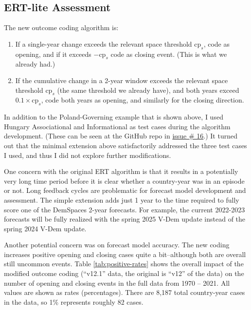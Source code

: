 \documentclass[
  11pt,
]{article}
\providecommand{\tightlist}{%
  \setlength{\itemsep}{0pt}\setlength{\parskip}{0pt}}
\begin{document}
\hypertarget{ert-lite-assessment}{%
\subsection{ERT-lite Assessment}\label{ert-lite-assessment}}

The new outcome coding algorithm is:

\begin{enumerate}
\def\labelenumi{\arabic{enumi}.}
\tightlist
\item
  If a single-year change exceeds the relevant space threshold
  \(\textrm{cp}_s\), code as opening, and if it exceeds
  \(-\textrm{cp}_s\) code as closing event. (This is what we already
  had.)
\item
  If the cumulative change in a 2-year window exceeds the relevant space
  threshold \(\textrm{cp}_s\) (the same threshold we already have), and
  both years exceed \(0.1 \times \textrm{cp}_s\), code both years as
  opening, and similarly for the closing direction.
\end{enumerate}

In addition to the Poland-Governing example that is shown above, I used
Hungary Associational and Informational as test cases during the
algorithm development. (These can be seen at the GitHub repo in
\href{https://github.com/vdeminstitute/demspaces/issues/16}{issue \# 16}.)
It turned out that the minimal extension above satisfactorily addressed
the three test cases I used, and thus I did not explore further
modifications.

One concern with the original ERT algorithm is that it results in a
potentially very long time period before it is clear whether a
country-year was in an episode or not. Long feedback cycles are
problematic for forecast model development and assessment. The simple
extension adds just 1 year to the time required to fully score one of
the DemSpaces 2-year forecasts. For example, the current 2022-2023
forecasts will be fully realized with the spring 2025 V-Dem update
instead of the spring 2024 V-Dem update.

Another potential concern was on forecast model accuracy. The new coding
increases positive opening and closing cases quite a bit--although both
are overall still uncommon events. Table \ref{tab:positive-rates} shows
the overall impact of the modified outcome coding (``v12.1'' data, the
original is ``v12'' of the data) on the number of opening and closing
events in the full data from 1970 -- 2021. All values are shown as rates
(percentages). There are 8,187 total country-year cases in the data, so
1\% represents roughly 82 cases.
\end{document}
